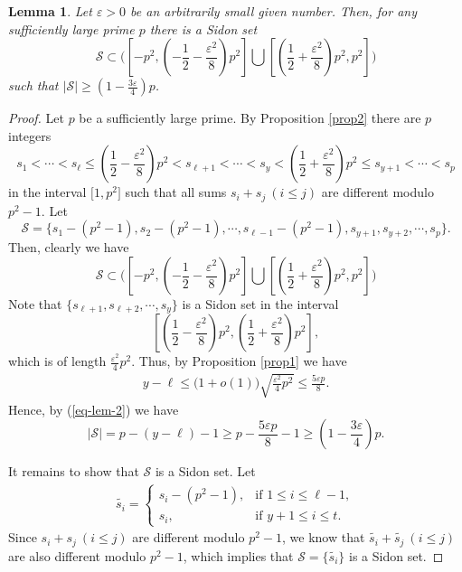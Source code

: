 \documentclass[10pt,a4paper]{amsart}
\newtheorem{lemma}{Lemma}
\begin{document}
\begin{lemma}\label{lem1}
Let $\varepsilon>0$ be an arbitrarily small given number. Then, for any sufficiently large prime $p$ there is a Sidon set 
$$
\mathscr{S}\subset \bigg(\left[-p^2, \left(-\frac{1}{2}-\frac{\varepsilon^2}{8}\right)p^2\right]\bigcup \left[\left(\frac{1}{2}+\frac{\varepsilon^2}{8}\right)p^2, p^2\right]\bigg)
$$ 
such that $\big|\mathscr{S}\big|\ge \left(1-\frac{3\varepsilon}{4}\right)p$.
\end{lemma}

\begin{proof}
Let $p$ be a sufficiently large prime. By Proposition \ref{prop2} there are $p$ integers
$$
s_1<\cdots<s_\ell\le \left(\frac{1}{2}-\frac{\varepsilon^2}{8}\right)p^2<s_{\ell+1}<\cdots<s_y<\left(\frac{1}{2}+\frac{\varepsilon^2}{8}\right)p^2\le s_{y+1}<\cdots<s_p
$$
in the interval $\big[1, p^2\big]$ such that 
all sums 
$
s_i+s_j\ (i\le j)
$
are different modulo $p^2-1$. Let
$$
\mathscr{S}=\Big\{s_1-(p^2-1),s_2-(p^2-1),\cdots, s_{\ell-1}-(p^2-1),s_{y+1}, s_{y+2},\cdots, s_p\Big\}.
$$
Then, clearly we have
$$
\mathscr{S}\subset \bigg(\left[-p^2, \left(-\frac{1}{2}-\frac{\varepsilon^2}{8}\right)p^2\right]\bigcup \left[\left(\frac{1}{2}+\frac{\varepsilon^2}{8}\right)p^2, p^2\right]\bigg)
$$ 
Note that $\big\{s_{\ell+1}, s_{\ell+2}, \cdots, s_y\big\}$ is a Sidon set in the interval 
$$
\left[\left(\frac{1}{2}-\frac{\varepsilon^2}{8}\right)p^2, \left(\frac{1}{2}+\frac{\varepsilon^2}{8}\right)p^2\right],
$$ 
which is of length $\frac{\varepsilon^2}{4}p^2$. Thus, by Proposition \ref{prop1} we have
\begin{align}\label{eq-lem-2}
y-\ell\le \big(1+o(1)\big)\sqrt{\frac{\varepsilon^2}{4}p^2}\le \frac{5\varepsilon p}{8}.
\end{align}
Hence, by (\ref{eq-lem-2}) we have
$$
\big|\mathscr{S}\big|=p-(y-\ell)-1\ge p-\frac{5\varepsilon p}{8}-1\ge \left(1-\frac{3\varepsilon}{4}\right)p.
$$

It remains to show that $\mathscr{S}$ is a Sidon set. Let
\begin{align*}
\widetilde{s_i}=
\begin{cases}
s_i-(p^2-1), & \text{if~}1\le i\le \ell-1,\\
s_i, & \text{if~}y+1\le i\le t.
\end{cases}
\end{align*}
Since 
$
s_i+s_j\ (i\le j)
$
are different modulo $p^2-1$, we know that 
$
\widetilde{s_i}+\widetilde{s_j}\ (i\le j)
$
are also different modulo $p^2-1$, which implies that $\mathscr{S}=\big\{\widetilde{s_i}\big\}$ is a Sidon set.
\end{proof}
\end{document}
